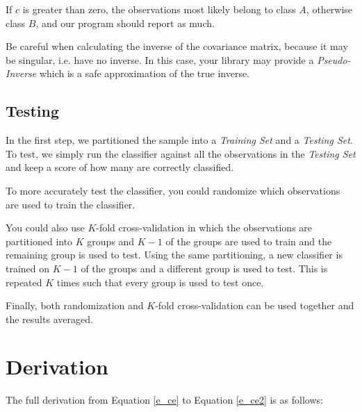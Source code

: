 \documentclass{article}
\begin{document}
If $c$ is greater than zero, the observations most likely belong
to class $A$, otherwise class $B$, and our program should report as much.

\begin{note}
Be careful when calculating the inverse of the covariance matrix,
because it may be singular, i.e. have no inverse.  In this case, your
library may provide a \emph{Pseudo-Inverse}\cite{wiki_pinv} which is
a safe approximation of the true inverse.
\end{note}

\subsection{Testing}
\label{ss_testing}

In the first step, we partitioned the sample into a \emph{Training
  Set} and a \emph{Testing Set}.  To test, we simply run the
  classifier against all the observations in the \emph{Testing Set}
  and keep a score of how many are correctly classified.

To more accurately test the classifier, you could randomize which
observations are used to train the classifier.

You could also use $K$-fold cross-validation in which the observations
are partitioned into $K$ groups and $K-1$ of the groups are used to
train and the remaining group is used to test.  Using the same
partitioning, a new classifier is trained on $K-1$ of the groups and a
different group is used to test.  This is repeated $K$ times such that
every group is used to test once.

Finally, both randomization and $K$-fold cross-validation can be used
together and the results averaged.

\appendix
\section{Derivation}
\label{app:derivation}

The full derivation from Equation \ref{e_ce} to Equation \ref{e_ce2} is
as follows:
\end{document}
